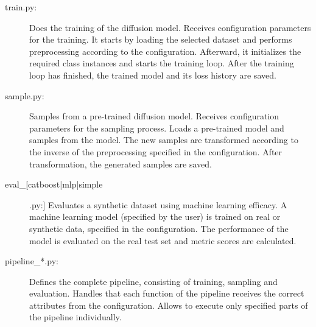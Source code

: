 \begin{description}
    \item[train.py:]
    Does the training of the diffusion model.
    Receives configuration parameters for the training.
    It starts by loading the selected dataset and performs preprocessing according to the configuration.
    Afterward, it initializes the required class instances and starts the training loop.
    After the training loop has finished, the trained model and its loss history are saved.

    \item[sample.py:]
    Samples from a pre-trained diffusion model.
    Receives configuration parameters for the sampling process.
    Loads a pre-trained model and samples from the model.
    The new samples are transformed according to the inverse of the preprocessing specified in the configuration.
    After transformation, the generated samples are saved.

    \item[eval\_[catboost|mlp|simple].py:]
    Evaluates a synthetic dataset using machine learning efficacy.
    A machine learning model (specified by the user) is trained on real or synthetic data, specified in the configuration.
    The performance of the model is evaluated on the real test set and metric scores are calculated.

    \item[pipeline\_*.py\footnotemark:]
    Defines the complete pipeline, consisting of training, sampling and evaluation.
    Handles that each function of the pipeline receives the correct attributes from the configuration.
    Allows to execute only specified parts of the pipeline individually.
    

\end{description}
